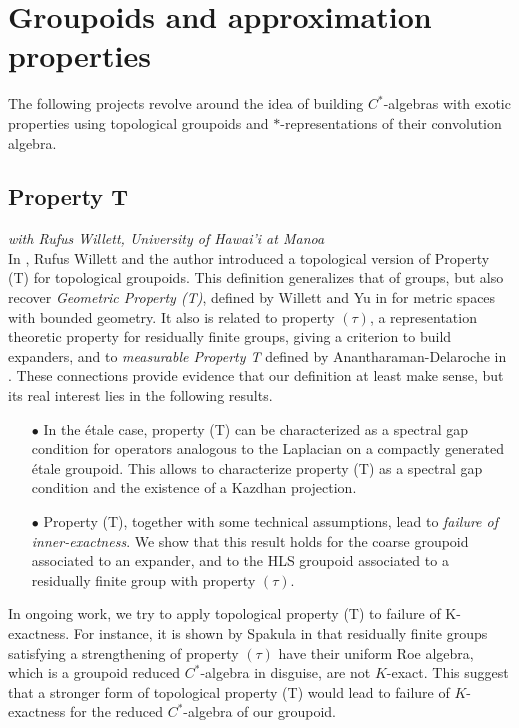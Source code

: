 \section{Groupoids and approximation properties}

The following projects revolve around the idea of building $C^*$-algebras with exotic properties using topological groupoids and $*$-representations of their convolution algebra.

\subsection*{Property T}

\textit{with Rufus Willett, University of Hawai'i at Manoa}\\

In \cite{DellWillett}, Rufus Willett and the author introduced a topological version of Property (T) for topological groupoids. This definition generalizes that of groups, but also recover \textit{Geometric Property (T)}, defined by Willett and Yu in \cite{WillettYu} for metric spaces with bounded geometry. It also is related to property $( \tau )$, a representation theoretic property for residually finite groups, giving a criterion to build expanders, and to \textit{measurable Property T} defined by Anantharaman-Delaroche in \cite{anantharamanT}. These connections provide evidence that our definition at least make sense, but its real interest lies in the following results.\\
\begin{itemize}
\item[$\bullet$] In the \'etale case, property (T) can be characterized as a spectral gap condition for operators analogous to the Laplacian on a compactly generated \'etale groupoid. This allows to characterize property (T) as a spectral gap condition and the existence of a Kazdhan projection. \\
\item[$\bullet$] Property (T), together with some technical assumptions, lead to \textit{failure of inner-exactness}. We show that this result holds for the coarse groupoid associated to an expander, and to the HLS groupoid associated to a residually finite group with property $(\tau )$. \\
\end{itemize}
In ongoing work, we try to apply topological property (T) to failure of K-exactness. For instance, it is shown by Spakula in \cite{SpakulaNonexact} that residually finite groups satisfying a strengthening of property $(\tau)$ have their uniform Roe algebra, which is a groupoid reduced $C^*$-algebra in disguise, are not $K$-exact. This suggest that a stronger form of topological property (T) would lead to failure of $K$-exactness for the reduced $C^*$-algebra of our groupoid. %

